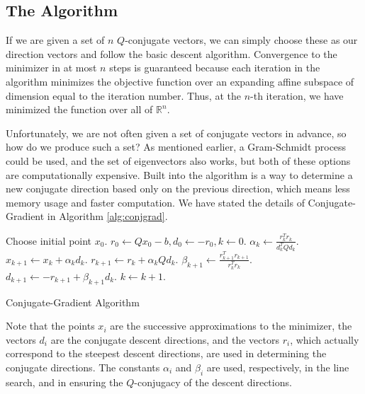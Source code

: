 \subsection*{The Algorithm} %

If we are given a set of $n$ $Q$-conjugate vectors, we can simply choose these as our direction vectors and follow the basic descent algorithm.
Convergence to the minimizer in at most $n$ steps is guaranteed because each iteration in the algorithm minimizes the objective function
over an expanding affine subspace of dimension equal to the iteration number. Thus, at the $n$-th iteration, we have minimized the function over all of
$\mathbb{R}^n$.

Unfortunately, we are not often given a set of conjugate vectors in advance, so how do we produce such a set? As mentioned earlier, a
Gram-Schmidt process could be used, and the set of eigenvectors also works, but both of these options are computationally expensive.
Built into the algorithm is a way to determine a new conjugate direction based only on the previous direction, which means less memory usage and
faster computation. We have stated the details of Conjugate-Gradient in Algorithm \ref{alg:conjgrad}.
\begin{algorithm}
\begin{algorithmic}[1]
    \State \textrm{Choose initial point } $x_0$.
    \State $r_0 \gets Qx_0 - b, d_0 \gets -r_0, k \gets 0$.
        \State $\alpha_k \gets \frac{r_k^Tr_k}{d_k^TQd_k}$.
        \State $x_{k+1} \gets x_k + \alpha_kd_k$.
        \State $r_{k+1} \gets r_k + \alpha_kQd_k$.
        \State $\beta_{k+1} \gets \frac{r_{k+1}^Tr_{k+1}}{r_k^Tr_k}$.
        \State $d_{k+1} \gets -r_{k+1} + \beta_{k+1}d_k$.
        \State $k \gets k+1$.
    \EndWhile
\EndProcedure
\end{algorithmic}
\caption{Conjugate-Gradient Algorithm}
\label{alg:conjgrad}
\end{algorithm}

Note that the points $x_i$ are the successive approximations to the minimizer, the vectors $d_i$ are the conjugate descent
directions, and the vectors $r_i$, which actually correspond to the steepest descent directions, are used in determining the conjugate directions.
The constants $\alpha_i$ and $\beta_i$ are used, respectively, in the line search, and in ensuring the $Q$-conjugacy of the descent directions.

